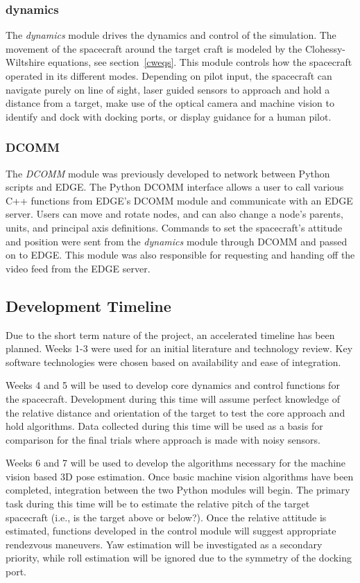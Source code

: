 \documentclass[journal, 10pt]{IEEEtran}
\begin{document}
\subsubsection{dynamics}
The \textit{dynamics} module drives the dynamics and control of the simulation. The movement of the spacecraft around the target craft is modeled by the Clohessy-Wiltshire equations, see section~\ref{cweqs}. This module controls how the spacecraft operated in its different modes. Depending on pilot input, the spacecraft can navigate purely on line of sight, laser guided sensors to approach and hold a distance from a target, make use of the optical camera and machine vision to identify and dock with docking ports, or display guidance for a human pilot.

\subsubsection{DCOMM}
The \textit{DCOMM} module was previously developed to network between Python scripts and EDGE. The Python DCOMM interface allows a user to call various C++ functions from EDGE's DCOMM module and communicate with an EDGE server. Users can move and rotate nodes, and can also change a node's parents, units, and principal axis definitions. Commands to set the spacecraft's attitude and position were sent from the \textit{dynamics} module through DCOMM and passed on to EDGE. This module was also responsible for requesting and handing off the video feed from the EDGE server.

\subsection{Development Timeline}
Due to the short term nature of the project, an accelerated timeline has been planned. Weeks 1-3 were used for an initial literature and technology review. Key software technologies were chosen based on availability and ease of integration.

Weeks 4 and 5 will be used to develop core dynamics and control functions for the spacecraft. Development during this time will assume perfect knowledge of the relative distance and orientation of the target to test the core approach and hold algorithms. Data collected during this time will be used as a basis for comparison for the final trials where approach is made with noisy sensors.

Weeks 6 and 7 will be used to develop the algorithms necessary for the machine vision based 3D pose estimation. Once basic machine vision algorithms have been completed, integration between the two Python modules will begin. The primary task during this time will be to estimate the relative pitch of the target spacecraft (i.e., is the target above or below?). Once the relative attitude is estimated, functions developed in the control module will suggest appropriate rendezvous maneuvers. Yaw estimation will be investigated as a secondary priority, while roll estimation will be ignored due to the symmetry of the docking port.
\end{document}
